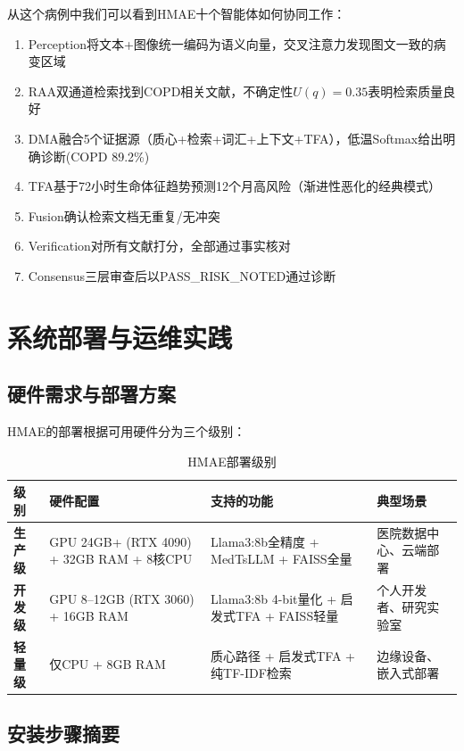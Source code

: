 \documentclass[11pt,a4paper]{ctexart}
\begin{document}
从这个病例中我们可以看到HMAE十个智能体如何协同工作：
\begin{enumerate}[nosep]
\item Perception将文本+图像统一编码为语义向量，交叉注意力发现图文一致的病变区域
\item RAA双通道检索找到COPD相关文献，不确定性$U(q)=0.35$表明检索质量良好
\item DMA融合5个证据源（质心+检索+词汇+上下文+TFA），低温Softmax给出明确诊断(COPD 89.2\%)
\item TFA基于72小时生命体征趋势预测12个月高风险（渐进性恶化的经典模式）
\item Fusion确认检索文档无重复/无冲突
\item Verification对所有文献打分，全部通过事实核对
\item Consensus三层审查后以PASS\_RISK\_NOTED通过诊断
\end{enumerate}

\newpage


\section{系统部署与运维实践}

\subsection{硬件需求与部署方案}

HMAE的部署根据可用硬件分为三个级别：

\begin{table}[H]
\centering
\small
\begin{tabular}{p{2cm}p{3.5cm}p{3.5cm}p{4.5cm}}
\toprule
\textbf{级别} & \textbf{硬件配置} & \textbf{支持的功能} & \textbf{典型场景} \\
\midrule
\textbf{生产级} & GPU 24GB+ (RTX 4090) + 32GB RAM + 8核CPU & Llama3:8b全精度 + MedTsLLM + FAISS全量 & 医院数据中心、云端部署 \\
\textbf{开发级} & GPU 8--12GB (RTX 3060) + 16GB RAM & Llama3:8b 4-bit量化 + 启发式TFA + FAISS轻量 & 个人开发者、研究实验室 \\
\textbf{轻量级} & 仅CPU + 8GB RAM & 质心路径 + 启发式TFA + 纯TF-IDF检索 & 边缘设备、嵌入式部署 \\
\bottomrule
\end{tabular}
\caption{HMAE部署级别}
\end{table}

\subsection{安装步骤摘要}
\end{document}
